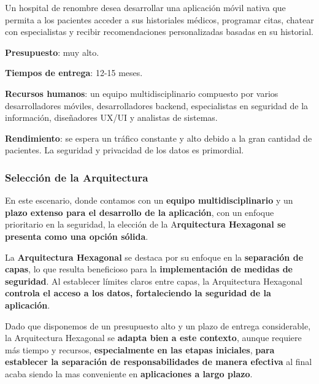 \documentclass[a4paper]{article}
\begin{document}
    Un hospital de renombre desea desarrollar una aplicación móvil nativa que permita a los pacientes acceder a sus historiales médicos, programar citas, chatear con especialistas y recibir recomendaciones personalizadas basadas en su historial.\vspace{0.2cm}
    
    \textbf{Presupuesto}: muy alto.\vspace{0.2cm}
    
    \textbf{Tiempos de entrega}: 12-15 meses.\vspace{0.2cm}
    
    \textbf{Recursos humanos}: un equipo multidisciplinario compuesto por varios desarrolladores móviles, desarrolladores backend, especialistas en seguridad de la información, diseñadores UX/UI y analistas de sistemas.\vspace{0.2cm}
    
    \textbf{Rendimiento}: se espera un tráfico constante y alto debido a la gran cantidad de pacientes. La seguridad y privacidad de los datos es primordial.
    
    \subsubsection{Selección de la Arquitectura}
    
    En este escenario, donde contamos con un \textbf{equipo multidisciplinario} y un \textbf{plazo extenso para el desarrollo de la aplicación}, con un enfoque prioritario en la seguridad, la elección de la A\textbf{rquitectura Hexagonal se presenta como una opción sólida}.\vspace{0.3cm}

    La \textbf{Arquitectura Hexagonal} se destaca por su enfoque en la \textbf{separación de capas}, lo que resulta beneficioso para la \textbf{implementación de medidas de seguridad}. Al establecer límites claros entre capas, la Arquitectura Hexagonal \textbf{controla el acceso a los datos, fortaleciendo la seguridad de la aplicación}.\vspace{0.3cm}
    
    Dado que disponemos de un presupuesto alto y un plazo de entrega considerable, la Arquitectura Hexagonal se \textbf{adapta bien a este contexto}, aunque requiere más tiempo y recursos, \textbf{especialmente en las etapas iniciales}, \textbf{para establecer la separación de responsabilidades de manera efectiva} al final acaba siendo la mas conveniente en \textbf{aplicaciones a largo plazo}.\vspace{0.3cm}
    
\end{document}
